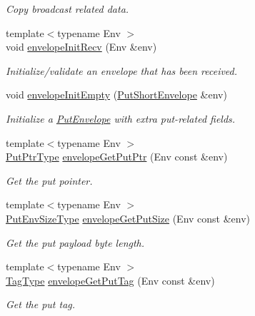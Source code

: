 \begin{DoxyCompactItemize}
\begin{DoxyCompactList}\small\item\em Copy broadcast related data. \end{DoxyCompactList}\item 
{\footnotesize template$<$typename Env $>$ }\\void \hyperlink{namespacevt_ace3e4542ae09ecd9728bea6548d71d5a}{envelope\+Init\+Recv} (Env \&env)
\begin{DoxyCompactList}\small\item\em Initialize/validate an envelope that has been received. \end{DoxyCompactList}\item 
void \hyperlink{namespacevt_ab507eac4b5cf7e2712f2c626b379498e}{envelope\+Init\+Empty} (\hyperlink{namespacevt_a8d7a7de9e76bfea1600009a775b7298c}{Put\+Short\+Envelope} \&env)
\begin{DoxyCompactList}\small\item\em Initialize a {\ttfamily \hyperlink{structvt_1_1_put_envelope}{Put\+Envelope}} with extra put-\/related fields. \end{DoxyCompactList}\item 
{\footnotesize template$<$typename Env $>$ }\\\hyperlink{namespacevt_a537693bfe0223c71eb52bdbd6ea2c741}{Put\+Ptr\+Type} \hyperlink{namespacevt_a56ab014300930ba8ffc902793035eca2}{envelope\+Get\+Put\+Ptr} (Env const \&env)
\begin{DoxyCompactList}\small\item\em Get the put pointer. \end{DoxyCompactList}\item 
{\footnotesize template$<$typename Env $>$ }\\\hyperlink{namespacevt_aa241444e21c15238e185923792814fe4}{Put\+Env\+Size\+Type} \hyperlink{namespacevt_abbd3e4684f30ad052e43a1655f540b6f}{envelope\+Get\+Put\+Size} (Env const \&env)
\begin{DoxyCompactList}\small\item\em Get the put payload byte length. \end{DoxyCompactList}\item 
{\footnotesize template$<$typename Env $>$ }\\\hyperlink{namespacevt_a84ab281dae04a52a4b243d6bf62d0e52}{Tag\+Type} \hyperlink{namespacevt_aaf50340390d58fe42775ae5b8e413f28}{envelope\+Get\+Put\+Tag} (Env const \&env)
\begin{DoxyCompactList}\small\item\em Get the put tag. \end{DoxyCompactList}\item 

\end{DoxyCompactItemize}
